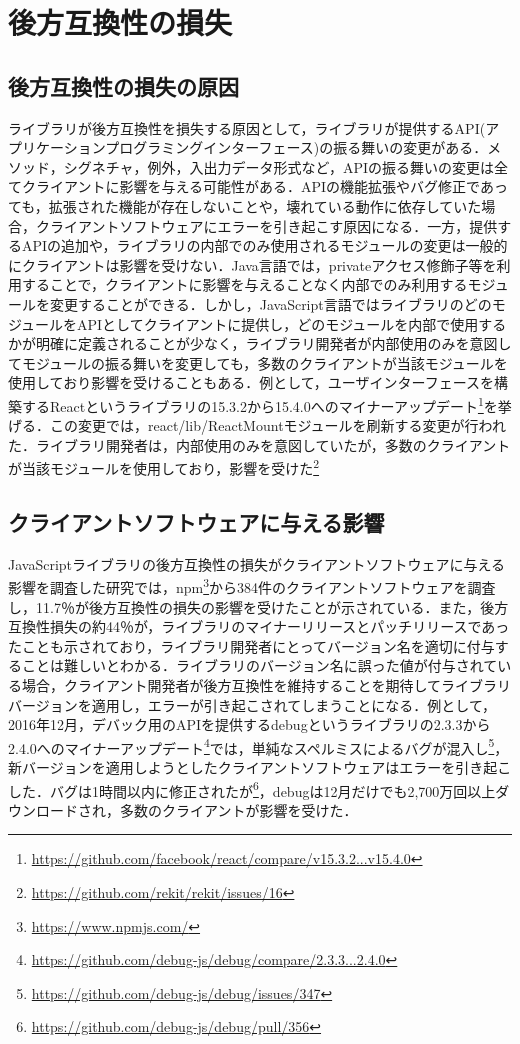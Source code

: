 \documentclass[11pt,dvipdfmx]{jreport}
\begin{document}
\chapter{後方互換性の損失}\label{chap:backward-compatibility}

\section{後方互換性の損失の原因}
ライブラリが後方互換性を損失する原因として，ライブラリが提供するAPI(アプリケーションプログラミングインターフェース)の振る舞いの変更がある．メソッド，シグネチャ，例外，入出力データ形式など，APIの振る舞いの変更は全てクライアントに影響を与える可能性がある．APIの機能拡張やバグ修正であっても，拡張された機能が存在しないことや，壊れている動作に依存していた場合，クライアントソフトウェアにエラーを引き起こす原因になる．一方，提供するAPIの追加や，ライブラリの内部でのみ使用されるモジュールの変更は一般的にクライアントは影響を受けない．Java言語では，privateアクセス修飾子等を利用することで，クライアントに影響を与えることなく内部でのみ利用するモジュールを変更することができる．しかし，JavaScript言語ではライブラリのどのモジュールをAPIとしてクライアントに提供し，どのモジュールを内部で使用するかが明確に定義されることが少なく，ライブラリ開発者が内部使用のみを意図してモジュールの振る舞いを変更しても，多数のクライアントが当該モジュールを使用しており影響を受けることもある．例として，ユーザインターフェースを構築するReactというライブラリの15.3.2から15.4.0へのマイナーアップデート\footnote{\url{https://github.com/facebook/react/compare/v15.3.2...v15.4.0}}を挙げる．この変更では，react/lib/ReactMountモジュールを刷新する変更が行われた．ライブラリ開発者は，内部使用のみを意図していたが，多数のクライアントが当該モジュールを使用しており，影響を受けた\footnote{\url{https://github.com/rekit/rekit/issues/16}}

\section{クライアントソフトウェアに与える影響}
JavaScriptライブラリの後方互換性の損失がクライアントソフトウェアに与える影響を調査した研究\cite{impact-analysis-for-clients}では，npm\footnote{\url{https://www.npmjs.com/}}から384件のクライアントソフトウェアを調査し，11.7％が後方互換性の損失の影響を受けたことが示されている．また，後方互換性損失の約44％が，ライブラリのマイナーリリースとパッチリリースであったことも示されており，ライブラリ開発者にとってバージョン名を適切に付与することは難しいとわかる．ライブラリのバージョン名に誤った値が付与されている場合，クライアント開発者が後方互換性を維持することを期待してライブラリバージョンを適用し，エラーが引き起こされてしまうことになる．例として，2016年12月，デバック用のAPIを提供するdebugというライブラリの2.3.3から2.4.0へのマイナーアップデート\footnote{\url{https://github.com/debug-js/debug/compare/2.3.3...2.4.0}}では，単純なスペルミスによるバグが混入し\footnote{\url{https://github.com/debug-js/debug/issues/347}}，新バージョンを適用しようとしたクライアントソフトウェアはエラーを引き起こした．バグは1時間以内に修正されたが\footnote{\url{https://github.com/debug-js/debug/pull/356}}，debugは12月だけでも2,700万回以上ダウンロードされ，多数のクライアントが影響を受けた．
\end{document}
